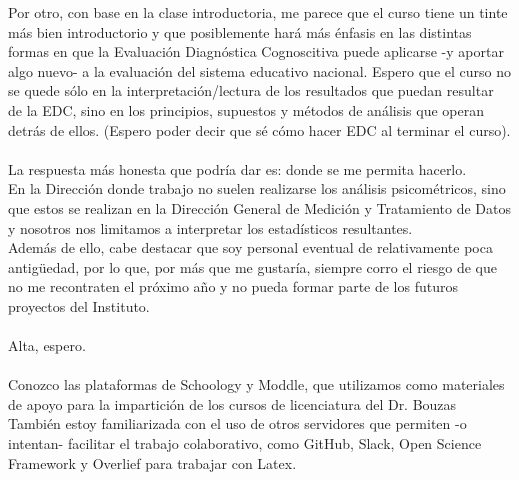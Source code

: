 \documentclass[11pt]{article}
\begin{document}
\begin{question}
Por otro, con base en la clase introductoria, me parece que el curso tiene un tinte más bien introductorio y que posiblemente hará más énfasis en las distintas formas en que la Evaluación Diagnóstica Cognoscitiva puede aplicarse -y aportar algo nuevo- a la evaluación del sistema educativo nacional. Espero que el curso no se quede sólo en la interpretación/lectura de los resultados que puedan resultar de la EDC, sino en los principios, supuestos y métodos de análisis que operan detrás de ellos. (Espero poder decir que sé cómo hacer EDC al terminar el curso).\\

\\
La respuesta más honesta que podría dar es: donde se me permita hacerlo.\\

En la Dirección donde trabajo no suelen realizarse los análisis psicométricos, sino que estos se realizan en la Dirección General de Medición y Tratamiento de Datos y nosotros nos limitamos a interpretar los estadísticos resultantes.\\

Además de ello, cabe destacar que soy personal eventual de relativamente poca antigüedad, por lo que, por más que me gustaría, siempre corro el riesgo de que no me recontraten el próximo año y no pueda formar parte de los futuros proyectos del Instituto. \\

\\
Alta, espero.\\

\\
Conozco las plataformas de Schoology y Moddle, que utilizamos como materiales de apoyo para la impartición de los cursos de licenciatura del Dr. Bouzas\\

También estoy familiarizada con el uso de otros servidores que permiten -o intentan- facilitar el trabajo colaborativo, como GitHub, Slack, Open Science Framework y Overlief para trabajar con Latex.\\


\end{question}
\end{document}
